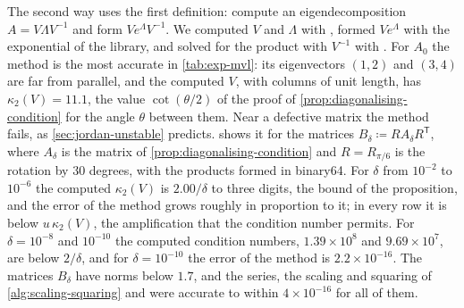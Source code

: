 The second way uses the first definition: compute an eigendecomposition $A=V\Lambda V^{-1}$ and form $Ve^\Lambda V^{-1}$. We computed $V$ and $\Lambda$ with , formed $Ve^\Lambda$ with the exponential of the library, and solved for the product with $V^{-1}$ with . For $A_0$ the method is the most accurate in \cref{tab:exp-mvl}: its eigenvectors $(1,2)$ and $(3,4)$ are far from parallel, and the computed $V$, with columns of unit length, has $\kappa_2(V)=11.1$, the value $\cot(\theta/2)$ of the proof of \cref{prop:diagonalising-condition} for the angle $\theta$ between them. Near a defective matrix the method fails, as \cref{sec:jordan-unstable} predicts.  shows it for the matrices $B_\delta\coloneqq RA_\delta R^{\mathsf T}$, where $A_\delta$ is the matrix of \cref{prop:diagonalising-condition} and $R=R_{\pi/6}$ is the rotation by $30$ degrees, with the products formed in binary64. For $\delta$ from $10^{-2}$ to $10^{-6}$ the computed $\kappa_2(V)$ is $2.00/\delta$ to three digits, the bound of the proposition, and the error of the method grows roughly in proportion to it; in every row it is below $u\,\kappa_2(V)$, the amplification that the condition number permits. For $\delta=10^{-8}$ and $10^{-10}$ the computed condition numbers, $1.39\times10^8$ and $9.69\times10^7$, are below $2/\delta$, and for $\delta=10^{-10}$ the error of the method is $2.2\times10^{-16}$. The matrices $B_\delta$ have norms below $1.7$, and the series, the scaling and squaring of \cref{alg:scaling-squaring} and  were accurate to within $4\times10^{-16}$ for all of them.

\begin{table}
\end{table}

